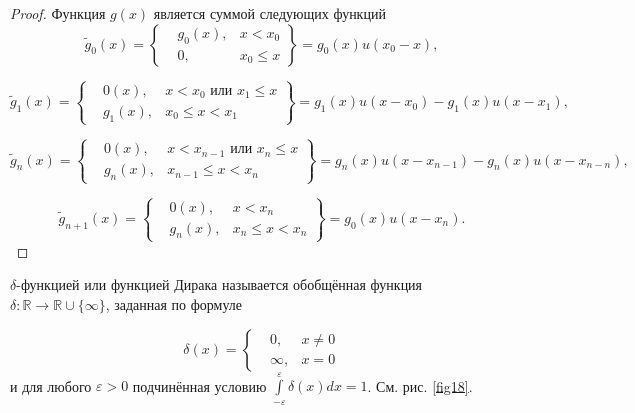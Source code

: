 \begin{proof}
	Функция $g(x)$ является суммой следующих функций
	\begin{equation*}
		\widetilde{g}_0(x)=
		\left\{\begin{aligned}
			&g_0(x), &x<x_0\\
			&0,		&x_0\leqslant x
		\end{aligned}\right\}
		=g_0(x)u(x_0-x),
	\end{equation*}

	\begin{equation*}
		\widetilde{g}_1(x)=
		\left\{\begin{aligned}
			&0(x), &x<x_0 \text{ или } x_1\leqslant x \\
			&g_1(x), &x_0\leqslant x<x_1
		\end{aligned}\right\}
		=g_1(x)u(x-x_0)-g_1(x)u(x-x_1),
	\end{equation*}

	\begin{equation*}
		\widetilde{g}_n(x)=
		\left\{\begin{aligned}
			&0(x), &x<x_{n-1} \text{ или } x_n\leqslant x \\
			&g_n(x), &x_{n-1}\leqslant x<x_n
		\end{aligned}\right\}
		=g_n(x)u(x-x_{n-1})-g_n(x)u(x-x_{n-n}),
	\end{equation*}

		\begin{equation*}
		\widetilde{g}_{n+1}(x)=
		\left\{\begin{aligned}
			&0(x), &x<x_{n}\\
			&g_n(x),&x_{n}\leqslant x<x_n
		\end{aligned}\right\}
		=g_0(x)u(x-x_{n}).
	\end{equation*}

\end{proof}

\begin{definition}
\label{def:13.4}
	$\delta$-функцией или функцией Дирака называется обобщённая функция
	$\delta : \mathbb{R}\rightarrow\mathbb{R}\cup\{\infty\}$, заданная по формуле

	\begin{equation*}
		\delta(x)=
		\left\{\begin{aligned}
			&0, &x \neq 0 \\
			&\infty, &x=0			
		\end{aligned}\right.
	\end{equation*}
	и для любого $\varepsilon > 0$ подчинённая условию $\int\limits^\varepsilon_{-\varepsilon}\delta(x)dx=1$. См. рис. \ref{fig18}.
\end{definition}

